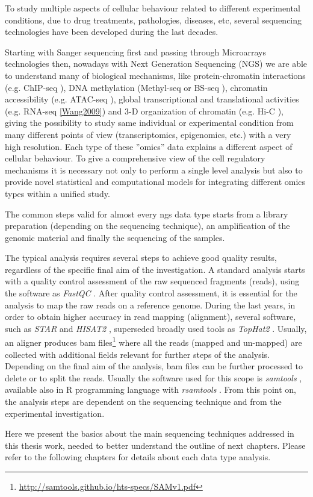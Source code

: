 To study multiple aspects of cellular behaviour related to different experimental conditions, due to drug treatments, pathologies, diseases, etc, several sequencing technologies have been developed during the last decades.

Starting with Sanger sequencing first and passing through Microarrays technologies then, nowadays with Next Generation Sequencing (NGS) we are able to understand many of biological mechanisms, like protein-chromatin interactions (e.g. ChIP-seq \cite{Park2009}), DNA methylation (Methyl-seq or BS-seq \cite{Frommer1992}), chromatin accessibility (e.g. ATAC-seq \cite{Buenrostro2013}), global transcriptional and translational activities (e.g. RNA-seq \ref{Wang2009}) and 3-D organization of chromatin (e.g. Hi-C \cite{VanBerkum2010}), giving the possibility to study same individual or experimental condition from many different points of view (transcriptomics, epigenomics, etc.) with a very high resolution. Each type of these ''omics'' data explains a different aspect of cellular behaviour. 
To give a comprehensive view of the cell regulatory mechanisms it is necessary not only to perform a single level analysis but also to provide novel statistical and computational models for integrating different omics types within a unified study.

The common steps valid for almost every \gls{ngs} data type starts from a library preparation (depending on the sequencing technique), an amplification of the genomic material and finally the sequencing of the samples.

The typical analysis requires several steps to achieve good quality results, regardless of the specific final aim of the investigation.
A standard analysis starts with a quality control assessment of the raw sequenced fragments (reads), using the software as \textit{FastQC} \cite{Andrews2010}.
After quality control assessment, it is essential for the analysis to map the raw reads on a reference genome. 
During the last years, in order to obtain higher accuracy in read mapping (alignment), several software, such as \textit{STAR} \cite{Dobin2013} and \textit{HISAT2} \cite{Kim2015}, superseded broadly used tools as \textit{TopHat2} \cite{Kim2013}.
Usually, an aligner produces \gls{bam} files\footnote{\url{http://samtools.github.io/hts-specs/SAMv1.pdf}} \cite{Li2009} where all the reads (mapped and un-mapped) are collected with additional fields relevant for further steps of the analysis.
Depending on the final aim of the analysis, \gls{bam} files can be further processed to delete or to split the reads. 
Usually the software used for this scope is \textit{samtools} \cite{Li2009, Li2011}, available also in R programming language with \textit{rsamtools} \cite{Morgan}.
From this point on, the analysis steps are dependent on the sequencing technique and from the experimental investigation.

Here we present the basics about the main sequencing techniques addressed in this thesis work, needed to better understand the outline of next chapters.
Please refer to the following chapters for details about each data type analysis.